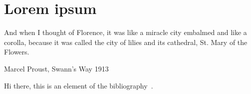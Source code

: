 \section{Lorem ipsum}
\epigraph{And when I thought of Florence, it was like a miracle city embalmed and like a corolla, because it was called the city of lilies and its cathedral, St. Mary of the Flowers.}{Marcel Proust, Swann's Way 1913}
Hi there, this is an element of the bibliography~\cite{2022}.